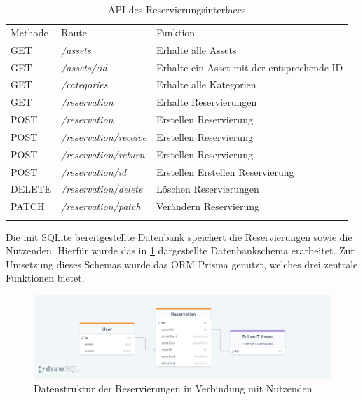 \begin{table}[h]
  \centering
  \caption{API des Reservierungsinterfaces}
  \begin{tabular}{lll}
    \arrayrulecolor{maincolor}\hline
    \sffamily\color{maincolor}Methode & \sffamily\color{maincolor}Route &
    \sffamily\color{maincolor}Funktion \\
    \arrayrulecolor{maincolor}\hline
    GET                               & \textit{/assets}                & Erhalte alle Assets \\
    GET                               & \textit{/assets/:id}            & Erhalte ein Asset mit der
    entsprechende ID                            \\
    GET                               & \textit{/categories}            & Erhalte alle Kategorien \\
    GET                               & \textit{/reservation}           & Erhalte Reservierungen \\
    POST                              & \textit{/reservation}           & Erstellen Reservierung \\
    POST                              & \textit{/reservation/receive}   & Erstellen Reservierung \\
    POST                              & \textit{/reservation/return}    & Erstellen Reservierung \\
    POST                              & \textit{/reservation/id}        & Erstellen Erstellen
    Reservierung                                      \\
    DELETE                            & \textit{/reservation/delete}    & Löschen Reservierungen \\
    PATCH                             & \textit{/reservation/patch}     & Verändern Reservierung \\
    \arrayrulecolor{maincolor}\hline
  \end{tabular}
  \label{table:impl-backend-routes}
\end{table}

Die mit SQLite bereitgestellte Datenbank speichert die Reservierungen sowie die Nutzenden. Hierfür
wurde das in \ref{fig:orm} dargestellte Datenbankschema erarbeitet. Zur Umsetzung dieses Schemas
wurde das ORM Prisma genutzt, welches drei zentrale Funktionen bietet.

\begin{figure}[ht]
  \centering
  \includegraphics[scale=0.25]{Bilder/drawSQL-export-2022-10-09_15 56.png}
  \caption[Datenstruktur der Reservierungen in Verbindung mit Nutzenden]{Datenstruktur der Reservierungen in Verbindung mit Nutzenden}
  \label{fig:orm}
\end{figure}


